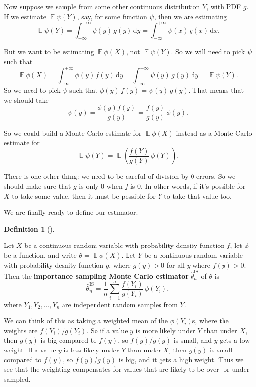 \documentclass[
  letterpaper,
  DIV=11,
  numbers=noendperiod]{scrreprt}
\newcommand{\Exg}{\operatorname{\mathbb{E}}}
\theoremstyle{plain}
\theoremstyle{definition}
\newtheorem{definition}{Definition}[chapter]
\theoremstyle{definition}
\theoremstyle{remark}
\begin{document}
Now suppose we sample from some other continuous distribution \(Y\),
with PDF \(g\). If we estimate \(\Exg \psi(Y)\), say, for some function
\(\psi\), then we are estimating
\[\Exg \psi(Y) = \int_{-\infty}^{+\infty} \psi(y)\,g(y) \, \mathrm{d}y = \int_{-\infty}^{+\infty} \psi(x)\,g(x) \, \mathrm{d}x . \]

But we want to be estimating \(\Exg\phi(X)\), not \(\Exg\psi(Y)\). So we
will need to pick \(\psi\) such that
\[ \Exg \phi(X) = \int_{-\infty}^{+\infty} \phi(y)\,f(y)\,\mathrm{d}y = \int_{-\infty}^{+\infty} \psi(y)\,g(y) \, \mathrm{d}y = \Exg \psi(Y) . \]
So we need to pick \(\psi\) such that \(\phi(y)\,f(y) = \psi(y)\,g(y)\).
That means that we should take
\[\psi(y) = \frac{\phi(y) f(y)}{g(y)} = \frac{f(y)}{g(y)}\,\phi(y). \]

So we could build a Monte Carlo estimate for \(\Exg \phi(X)\) instead as
a Monte Carlo estimate for
\[ \Exg \psi(Y) = \Exg \left(\frac{f(Y)}{g(Y)}\,\phi(Y) \right) . \]

There is one other thing: we need to be careful of division by \(0\)
errors. So we should make sure that \(g\) is only 0 when \(f\) is 0. In
other words, if it's possible for \(X\) to take some value, then it must
be possible for \(Y\) to take that value too.

We are finally ready to define our estimator.

\begin{definition}[]\protect\hypertarget{def-IS}{}\label{def-IS}

Let \(X\) be a continuous random variable with probability density
function \(f\), let \(\phi\) be a function, and write
\(\theta = \Exg\phi(X)\). Let \(Y\) be a continuous random variable with
probability desnity function \(g\), where \(g(y) > 0\) for all \(y\)
where \(f(y) > 0\). Then the \textbf{importance sampling Monte Carlo
estimator} \(\widehat\theta_n^{\mathrm{IS}}\) of \(\theta\) is
\[ \widehat{\theta}_n^{\mathrm{IS}} = \frac{1}{n} \sum_{i=1}^{n} \frac{f(Y_i)}{g(Y_i)}\, \phi(Y_i)   ,\]
where \(Y_1, Y_2, \dots, Y_n\) are independent random samples from
\(Y\).

\end{definition}

We can think of this as taking a weighted mean of the \(\phi(Y_i)\)s,
where the weights are \(f(Y_i)/g(Y_i)\). So if a value \(y\) is more
likely under \(Y\) than under \(X\), then \(g(y)\) is big compared to
\(f(y)\), so \(f(y)/g(y)\) is small, and \(y\) gets a low weight. If a
value \(y\) is less likely under \(Y\) than under \(X\), then \(g(y)\)
is small compared to \(f(y)\), so \(f(y) / g(y)\) is big, and it gets a
high weight. Thus we see that the weighting compensates for values that
are likely to be over- or under-sampled.
\end{document}
